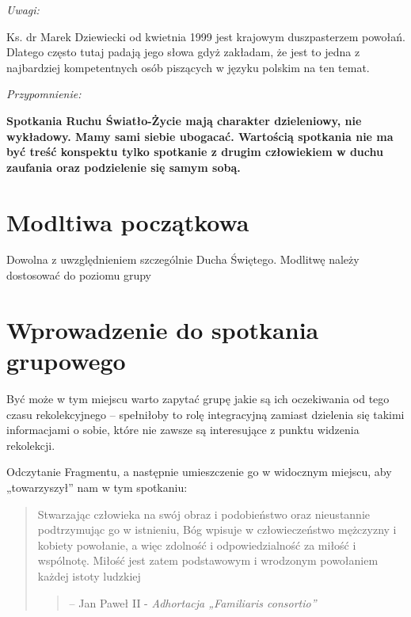 \documentclass[a5paper,10pt,polish]{book}
\begin{document}
\begin{DUlineblock}{0em}
\item[] \emph{Uwagi:}
\item[] Ks. dr Marek Dziewiecki od kwietnia 1999 jest krajowym duszpasterzem powołań. Dlatego często tutaj padają jego słowa gdyż zakładam, że jest to jedna z najbardziej kompetentnych osób piszących w języku polskim na ten temat.
\item[] \emph{Przypomnienie:}
\item[] \textbf{Spotkania Ruchu Światło-Życie  mają charakter dzieleniowy, nie wykładowy. Mamy sami siebie ubogacać. Wartością spotkania nie ma być treść konspektu tylko spotkanie z drugim człowiekiem w duchu zaufania oraz podzielenie się samym sobą.}
\end{DUlineblock}


\section{Modltiwa początkowa}
\label{miliardowice-2005-jesien/spotkanie1:modltiwa-poczatkowa}
Dowolna z uwzględnieniem szczególnie Ducha Świętego. Modlitwę należy dostosować do poziomu grupy


\section{Wprowadzenie do spotkania grupowego}
\label{miliardowice-2005-jesien/spotkanie1:wprowadzenie-do-spotkania-grupowego}
Być może w tym miejscu warto zapytać grupę jakie są ich oczekiwania od tego czasu rekolekcyjnego – spełniłoby to rolę integracyjną zamiast dzielenia się takimi informacjami o sobie, które nie zawsze są interesujące  z punktu widzenia rekolekcji.

Odczytanie Fragmentu, a następnie umieszczenie go w widocznym miejscu, aby „towarzyszył” nam w tym spotkaniu:
\begin{quote}

Stwarzając człowieka  na swój obraz i podobieństwo  oraz nieustannie podtrzymując go w istnieniu, Bóg wpisuje w człowieczeństwo mężczyzny i kobiety powołanie, a więc zdolność i odpowiedzialność za miłość i wspólnotę. Miłość jest zatem podstawowym i wrodzonym powołaniem każdej istoty ludzkiej
\begin{quote}

--  Jan Paweł II - \emph{Adhortacja „Familiaris consortio”}
\end{quote}
\end{quote}
\end{document}
